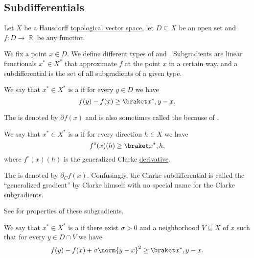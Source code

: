 \subsection{Subdifferentials}\label{subsec:subdifferentials}

Let \( X \) be a Hausdorff \hyperref[def:topological_vector_space]{topological vector space}, let \( D \subseteq X \) be an open set and \( f: D \to \BbbR \) be any function.

\begin{definition}\label{def:subdifferentials}
  We fix a point \( x \in D \). We define different types of  and . Subgradients are linear functionals \( x^* \in X^* \) that approximate \( f \) at the point \( x \) in a certain way, and a subdifferential is the set of all subgradients of a given type.

  \begin{defenum}
    \mcite\cite[59]{Clarke2013}We say that \( x^* \in X^* \) is a  if for every \( y \in D \) we have
    \begin{equation*}
      f(y) - f(x) \geq \inner {x^*} {y - x}.
    \end{equation*}

    The  is denoted by \( \partial f(x) \) and is also sometimes called the  because of .

    \mcite\cite[def. 10.3]{Clarke2013}We say that \( x^* \in X^* \) is a  if for every direction \( h \in X \) we have
    \begin{equation*}
      f^\circ(x)(h) \geq \inner {x^*} h,
    \end{equation*}
    where \( f^\circ(x)(h) \) is the generalized Clarke \hyperref[def:nonsmooth_derivatives/clarke]{derivative}.

    The  is denoted by \( \partial_C f(x) \). Confusingly, the Clarke subdifferential is called the \enquote{generalized gradient} by Clarke himself with no special name for the Clarke subgradients.

    See  for properties of these subgradients.

    \mcite\cite[227]{Clarke2013}We say that \( x^* \in X^* \) is a  if there exist \( \sigma > 0 \) and a neighborhood \( V \subseteq X \) of \( x \) such that for every \( y \in D \cap V \) we have
    \begin{equation*}
      f(y) - f(x) + \sigma \norm{y - x}^2 \geq \inner {x^*} {y - x}.
    \end{equation*}


\end{defenum}
\end{definition}
